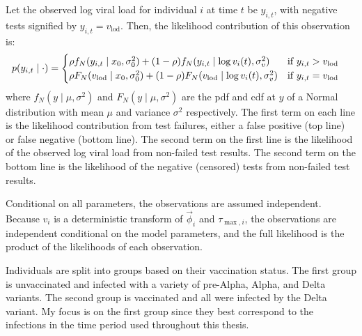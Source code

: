 \documentclass[thesis.tex]{subfiles}
\begin{document}
Let the observed log viral load for individual $i$ at time $t$ be $y_{i,t}$, with negative tests signified by $y_{i,t}=v_\text{lod}$.
Then, the likelihood contribution of this observation is:
\begin{align}
p(y_{i,t} \mid \cdot) &= \begin{cases}
    \rho f_N(y_{i,t} \mid x_0, \sigma_0^2) + (1 - \rho) f_N(y_{i,t} \mid \log v_i(t), \sigma_v^2) & \text{if $y_{i,t} > v_\text{lod}$}\\
    \rho F_N(v_\text{lod} \mid x_0, \sigma_0^2) + (1 - \rho) F_N(v_\text{lod} \mid \log v_i(t), \sigma_v^2) & \text{if $y_{i,t} = v_\text{lod}$} \label{ATACCC:eq:hakki-likelihood}
\end{cases}
\end{align}
where $f_N(y \mid \mu, \sigma^2)$ and $F_N(y \mid \mu, \sigma^2)$ are the pdf and cdf at $y$ of a Normal distribution with mean $\mu$ and variance $\sigma^2$ respectively.
The first term on each line is the likelihood contribution from test failures, either a false positive (top line) or false negative (bottom line).
The second term on the first line is the likelihood of the observed log viral load from non-failed test results.
The second term on the bottom line is the likelihood of the negative (censored) tests from non-failed test results.

Conditional on all parameters, the observations are assumed independent.
Because $v_i$ is a deterministic transform of $\vec{\phi}_i$ and $\tau_{\max,i}$, the observations are independent conditional on the model parameters, and the full likelihood is the product of the likelihoods of each observation.

Individuals are split into groups based on their vaccination status.
The first group is unvaccinated and infected with a variety of pre-Alpha, Alpha, and Delta variants.
The second group is vaccinated and all were infected by the Delta variant.
My focus is on the first group since they best correspond to the infections in the time period used throughout this thesis.
\end{document}
